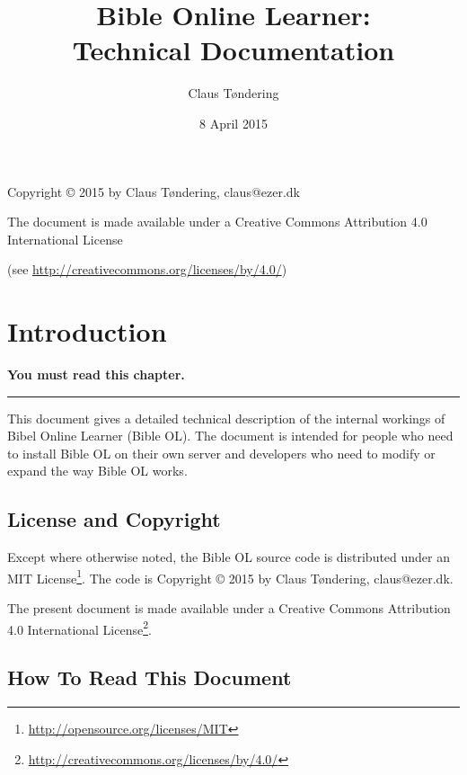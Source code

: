 \documentclass[11pt,oneside,a4paper]{memoir}
\title{Bible Online Learner:\\Technical Documentation}
\author{Claus Tøndering}
\date{8 April 2015}
\begin{document}
\begin{titlingpage*}
\maketitle

\begin{center}
Copyright © 2015 by Claus Tøndering, claus@ezer.dk

\vspace{5mm}

The document is made available under a Creative Commons Attribution 4.0 International License

(see \url{http://creativecommons.org/licenses/by/4.0/})
\end{center}
\end{titlingpage*}


\clearpage
\tableofcontents
{} %

\chapter{Introduction}

\textbf{You must read this chapter.}
\plainbreak{3}

This document gives a detailed technical description of the internal workings of Bibel Online
Learner (Bible OL). The document is intended for people who need to install Bible OL on their own
server and developers who need to modify or expand the way Bible OL works.

\section{License and Copyright}

Except where otherwise noted, the Bible OL source code is distributed under an MIT
License\footnote{\url{http://opensource.org/licenses/MIT}}. The code is Copyright © 2015 by Claus
Tøndering, claus@ezer.dk.

The present document is made available under a Creative Commons Attribution 4.0 International
License\footnote{\url{http://creativecommons.org/licenses/by/4.0/}}.


\section{How To Read This Document}
\end{document}

